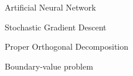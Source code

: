 %
%


\begin{description}[CABR]
\item[ANN]{Artificial Neural Network}
\item[SGD]{Stochastic Gradient Descent}
\item[POD]{Proper Orthogonal Decomposition}
\item[BVP]{Boundary-value problem}
\end{description}